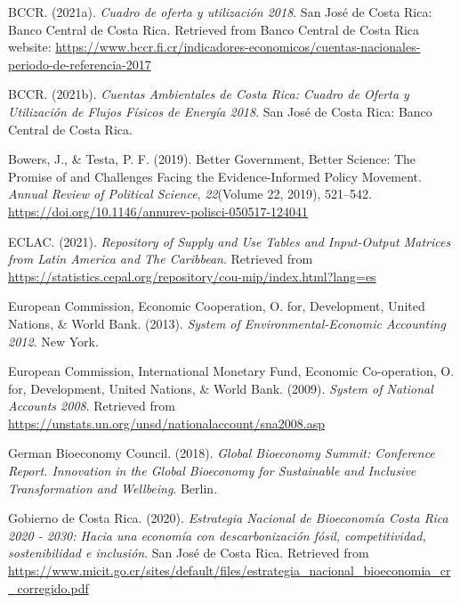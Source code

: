 \documentclass[
  letterpaper,
  DIV=11,
  numbers=noendperiod]{scrartcl}
\newlength{\cslhangindent}
\newenvironment{CSLReferences}[2] %
 {\begin{list}{}{%
  \setlength{\itemindent}{0pt}
  \setlength{\leftmargin}{0pt}
  \setlength{\parsep}{0pt}
  \ifodd #1
   \setlength{\leftmargin}{\cslhangindent}
   \setlength{\itemindent}{-1\cslhangindent}
  \fi
  \setlength{\itemsep}{#2\baselineskip}}}
 {\end{list}}
\begin{document}
\label{refs}
\begin{CSLReferences}{1}{0}
BCCR. (2021a). \emph{Cuadro de oferta y utilización 2018}. San José de
Costa Rica: Banco Central de Costa Rica. Retrieved from Banco Central de
Costa Rica website:
\url{https://www.bccr.fi.cr/indicadores-economicos/cuentas-nacionales-periodo-de-referencia-2017}

BCCR. (2021b). \emph{Cuentas {Ambientales} de {Costa} {Rica}: {Cuadro}
de {Oferta} y {Utilización} de {Flujos} {Físicos} de {Energía} 2018}.
San José de Costa Rica: Banco Central de Costa Rica.

Bowers, J., \& Testa, P. F. (2019). Better Government, Better Science:
The Promise of and Challenges Facing the Evidence-Informed Policy
Movement. \emph{Annual Review of Political Science}, \emph{22}(Volume
22, 2019), 521--542.
\url{https://doi.org/10.1146/annurev-polisci-050517-124041}

ECLAC. (2021). \emph{{Repository} of {Supply} and {Use Tables} and
{Input-Output Matrices} from {Latin America} and {The Caribbean}}.
Retrieved from
\url{https://statistics.cepal.org/repository/cou-mip/index.html?lang=es}

European Commission, Economic Cooperation, O. for, Development, United
Nations, \& World Bank. (2013). \emph{{System} of
{Environmental}-{Economic} {Accounting} {2012}}. New York.

European Commission, International Monetary Fund, Economic Co-operation,
O. for, Development, United Nations, \& World Bank. (2009).
\emph{{System} of {National} {Accounts} {2008}}. Retrieved from
\url{https://unstats.un.org/unsd/nationalaccount/sna2008.asp}

German Bioeconomy Council. (2018). \emph{{Global} {Bioeconomy} {Summit}:
{Conference} {Report}. {Innovation} in the {Global} {Bioeconomy} for
{Sustainable} and {Inclusive} {Transformation} and {Wellbeing}}. Berlin.

Gobierno de Costa Rica. (2020). \emph{Estrategia {Nacional} de
{Bioeconomía Costa Rica} 2020 - 2030: {Hacia} una economía con
descarbonización fósil, competitividad, sostenibilidad e inclusión}. San
José de Costa Rica. Retrieved from
\url{https://www.micit.go.cr/sites/default/files/estrategia_nacional_bioeconomia_cr_corregido.pdf}


\end{CSLReferences}
\end{document}
